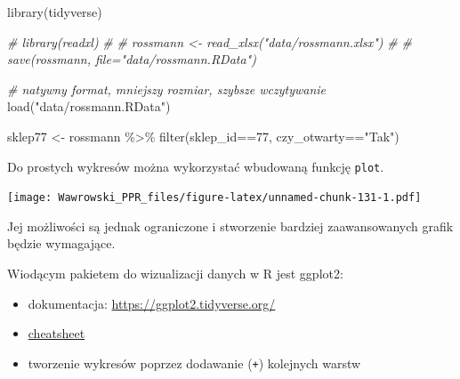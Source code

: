 \documentclass[
]{book}
\newenvironment{Shaded}{\begin{snugshade}}{\end{snugshade}}
\newcommand{\AttributeTok}[1]{\textcolor[rgb]{0.77,0.63,0.00}{#1}}
\newcommand{\CommentTok}[1]{\textcolor[rgb]{0.56,0.35,0.01}{\textit{#1}}}
\newcommand{\DecValTok}[1]{\textcolor[rgb]{0.00,0.00,0.81}{#1}}
\newcommand{\FunctionTok}[1]{\textcolor[rgb]{0.00,0.00,0.00}{#1}}
\newcommand{\NormalTok}[1]{#1}
\newcommand{\OtherTok}[1]{\textcolor[rgb]{0.56,0.35,0.01}{#1}}
\newcommand{\SpecialCharTok}[1]{\textcolor[rgb]{0.00,0.00,0.00}{#1}}
\newcommand{\StringTok}[1]{\textcolor[rgb]{0.31,0.60,0.02}{#1}}
\providecommand{\tightlist}{%
  \setlength{\itemsep}{0pt}\setlength{\parskip}{0pt}}
\begin{document}
\begin{Shaded}
\begin{Highlighting}[]
\FunctionTok{library}\NormalTok{(tidyverse)}

\CommentTok{\# library(readxl)}
\CommentTok{\# }
\CommentTok{\# rossmann \textless{}{-} read\_xlsx("data/rossmann.xlsx")}
\CommentTok{\#}
\CommentTok{\# save(rossmann, file="data/rossmann.RData")}

\CommentTok{\# natywny format, mniejszy rozmiar, szybsze wczytywanie}
\FunctionTok{load}\NormalTok{(}\StringTok{"data/rossmann.RData"}\NormalTok{)}

\NormalTok{sklep77 }\OtherTok{\textless{}{-}}\NormalTok{ rossmann }\SpecialCharTok{\%\textgreater{}\%}
  \FunctionTok{filter}\NormalTok{(sklep\_id}\SpecialCharTok{==}\DecValTok{77}\NormalTok{, czy\_otwarty}\SpecialCharTok{==}\StringTok{"Tak"}\NormalTok{)}
\end{Highlighting}
\end{Shaded}

Do prostych wykresów można wykorzystać wbudowaną funkcję \texttt{plot}.

\begin{Shaded}
\end{Shaded}

\texttt{[image: Wawrowski\_PPR\_files/figure-latex/unnamed-chunk-131-1.pdf]}

Jej możliwości są jednak ograniczone i stworzenie bardziej zaawansowanych grafik będzie wymagające.

Wiodącym pakietem do wizualizacji danych w R jest ggplot2:

\begin{itemize}
\tightlist
\item
  dokumentacja: \url{https://ggplot2.tidyverse.org/}
\item
  \href{https://github.com/rstudio/cheatsheets/blob/master/data-visualization-2.1.pdf}{cheatsheet}
\item
  tworzenie wykresów poprzez dodawanie (\texttt{+}) kolejnych warstw
\end{itemize}
\end{document}
